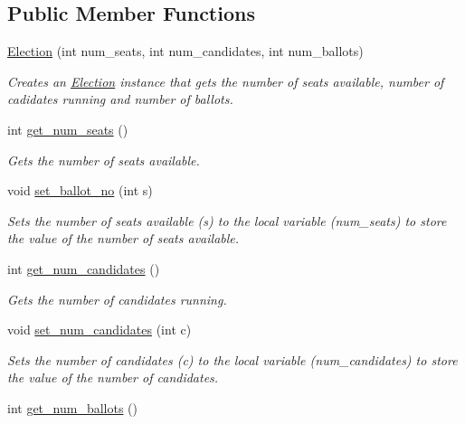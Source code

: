 \subsection*{Public Member Functions}
\begin{DoxyCompactItemize}
\item 
\hyperlink{class_election_af15999d79dbd51ad41380207a2fb0ba4}{Election} (int num\+\_\+seats, int num\+\_\+candidates, int num\+\_\+ballots)
\begin{DoxyCompactList}\small\item\em Creates an \hyperlink{class_election}{Election} instance that gets the number of seats available, number of cadidates running and number of ballots. \end{DoxyCompactList}\item 
int \hyperlink{class_election_a9582c81b6b89805f531197efb0e34db8}{get\+\_\+num\+\_\+seats} ()\hypertarget{class_election_a9582c81b6b89805f531197efb0e34db8}{}\label{class_election_a9582c81b6b89805f531197efb0e34db8}

\begin{DoxyCompactList}\small\item\em Gets the number of seats available. \end{DoxyCompactList}\item 
void \hyperlink{class_election_ad39320c11e6c6d5c95dc6128a2dd0a07}{set\+\_\+ballot\+\_\+no} (int s)
\begin{DoxyCompactList}\small\item\em Sets the number of seats available (s) to the local variable (num\+\_\+seats) to store the value of the number of seats available. \end{DoxyCompactList}\item 
int \hyperlink{class_election_aabeb70eb7aae4e60c6173b71e4218d96}{get\+\_\+num\+\_\+candidates} ()\hypertarget{class_election_aabeb70eb7aae4e60c6173b71e4218d96}{}\label{class_election_aabeb70eb7aae4e60c6173b71e4218d96}

\begin{DoxyCompactList}\small\item\em Gets the number of candidates running. \end{DoxyCompactList}\item 
void \hyperlink{class_election_ad73c41e88247a694c44370b4d28c04d0}{set\+\_\+num\+\_\+candidates} (int c)
\begin{DoxyCompactList}\small\item\em Sets the number of candidates (c) to the local variable (num\+\_\+candidates) to store the value of the number of candidates. \end{DoxyCompactList}\item 
int \hyperlink{class_election_a99f8cd6773f5c046b975eb39109cd123}{get\+\_\+num\+\_\+ballots} ()\hypertarget{class_election_a99f8cd6773f5c046b975eb39109cd123}{}\label{class_election_a99f8cd6773f5c046b975eb39109cd123}


\end{DoxyCompactItemize}
